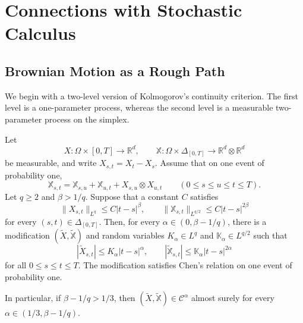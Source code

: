 \chapter{Connections with Stochastic Calculus}

\section{Brownian Motion as a Rough Path}

We begin with a two-level version of Kolmogorov's continuity criterion.  The
first level is a one-parameter process, whereas the second level is a
measurable two-parameter process on the simplex.

\begin{thm}
Let
\[
  X\colon\Omega\times[0,T]\to\mathbb R^d,
  \qquad
  \mathbb X\colon\Omega\times\Delta_{[0,T]}
       \to\mathbb R^d\otimes\mathbb R^d
\]
be measurable, and write $X_{s,t}=X_t-X_s$.  Assume that on one event of
probability one,
\[
  \mathbb X_{s,t}
  =\mathbb X_{s,u}+\mathbb X_{u,t}+X_{s,u}\otimes X_{u,t}
  \qquad(0\le s\le u\le t\le T).
\]
Let $q\ge2$ and $\beta>1/q$.  Suppose that a constant $C$ satisfies
\[
  \|X_{s,t}\|_{L^q}\le C|t-s|^\beta,
  \qquad
  \|\mathbb X_{s,t}\|_{L^{q/2}}\le C|t-s|^{2\beta}
\]
for every $(s,t)\in\Delta_{[0,T]}$.  Then, for every
$\alpha\in(0,\beta-1/q)$, there is a modification
$(\widetilde X,\widetilde{\mathbb X})$ and random variables
$K_\alpha\in L^q$ and $\mathbb K_\alpha\in L^{q/2}$ such that
\[
  |\widetilde X_{s,t}|\le K_\alpha|t-s|^\alpha,
  \qquad
  |\widetilde{\mathbb X}_{s,t}|
       \le\mathbb K_\alpha|t-s|^{2\alpha}
\]
for all $0\le s\le t\le T$.  The modification satisfies Chen's relation on
one event of probability one.

In particular, if $\beta-1/q>1/3$, then
$(\widetilde X,\widetilde{\mathbb X})\in\mathscr C^\alpha$ almost surely for
every $\alpha\in(1/3,\beta-1/q)$.
\end{thm}

